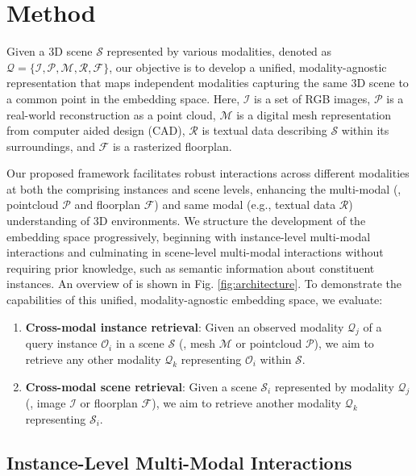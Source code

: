\section{Method}
\label{sec:method}
Given a 3D scene $\mathcal{S}$ represented by various modalities, denoted as $\mathcal{Q} = \{ \mathcal{I}, \mathcal{P}, \mathcal{M}, \mathcal{R}, \mathcal{F} \}$, our objective is to develop a unified, modality-agnostic representation that maps independent modalities capturing the same 3D scene to a common point in the embedding space. Here, $\mathcal{I}$ is a set of RGB images, $\mathcal{P}$ is a real-world reconstruction as a point cloud, $\mathcal{M}$ is a digital mesh representation from computer aided design (CAD), $\mathcal{R}$ is textual data describing $\mathcal{S}$ within its surroundings, and $\mathcal{F}$ is a rasterized floorplan.

Our proposed framework facilitates robust interactions across different modalities at both the comprising instances and scene levels, enhancing the multi-modal (\eg, pointcloud $\mathcal{P}$ and floorplan $\mathcal{F}$) and same modal (e.g., textual data $\mathcal{R}$) understanding of 3D environments. We structure the development of the embedding space progressively, beginning with instance-level multi-modal interactions and culminating in scene-level multi-modal interactions without requiring prior knowledge, such as semantic information about constituent instances. An overview of \project{} is shown in Fig. \ref{fig:architecture}. To demonstrate the capabilities of this unified, modality-agnostic embedding space, we evaluate:
\begin{enumerate}
    \item{\textbf{Cross-modal instance retrieval}}: Given an observed modality $\mathcal{Q}_{j}$ of a query instance $\mathcal{O}_i$ in a scene $\mathcal{S}$ (\eg, mesh $\mathcal{M}$ or pointcloud $\mathcal{P}$), we aim to retrieve any other modality $\mathcal{Q}_{k}$ representing $\mathcal{O}_i$ within $\mathcal{S}$.
    \item{\textbf{Cross-modal scene retrieval}}: Given a scene $\mathcal{S}_i$ represented by modality $\mathcal{Q}_j$ (\eg, image $\mathcal{I}$ or floorplan $\mathcal{F}$), we aim to retrieve another modality $\mathcal{Q}_{k}$ representing $\mathcal{S}_i$.
\end{enumerate}


\subsection{Instance-Level Multi-Modal Interactions}
\label{sec:object_encoder_training}

